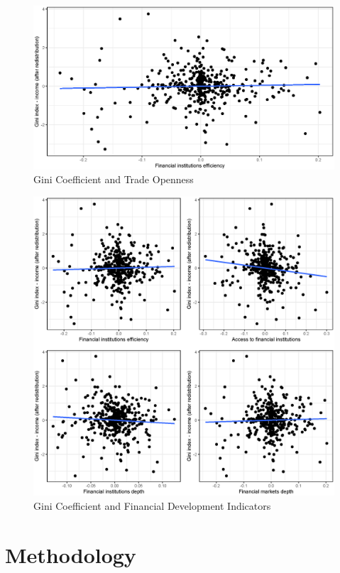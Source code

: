 \documentclass[a4paper,11pt]{article}
\begin{document}
\begin{figure}
    \caption{Gini Coefficient and Trade Openness}
\includegraphics[width=\textwidth, keepaspectratio]{figures/TradeOpenGiniNet_dm}
\end{figure}

\begin{figure}
    \caption{Gini Coefficient and Financial Development Indicators}
\includegraphics[width=\textwidth, keepaspectratio]{figures/plots_findev_gini_dm}
\end{figure}

%
%
\section{Methodology}
\end{document}
